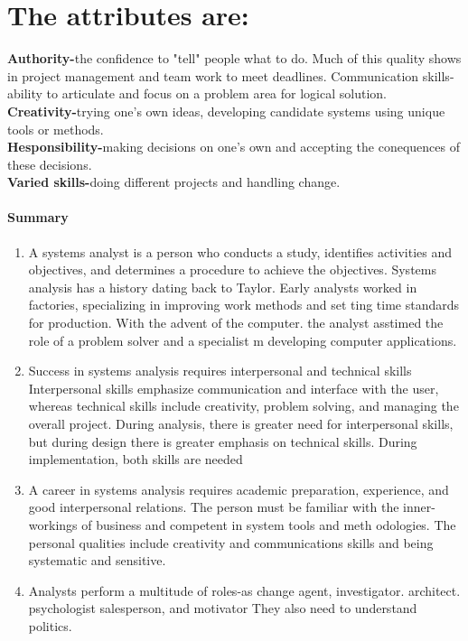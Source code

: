 \documentclass[a4paper,12pt]{report}
\begin{document}
\section{The attributes are:}
\textbf{Authority-}the confidence to "tell" people what to do. Much of this quality shows in project management and team work to meet deadlines. Communication skills-ability to articulate and focus on a problem area for logical solution.\\
\textbf{Creativity-}trying one's own ideas, developing candidate systems using unique tools or methods.\\
\textbf{Hesponsibility-}making decisions on one's own and accepting the conequences of these decisions.\\
\textbf{Varied skills-}doing different projects and handling change.
\paragraph{Summary }
\begin{enumerate}
	\item A systems analyst is a person who conducts a study, identifies activities and objectives, and determines a procedure to achieve the objectives. Systems analysis has a history dating back to Taylor. Early analysts worked in factories, specializing in improving work methods and set ting time standards for production. With the advent of the computer. the analyst asstimed the role of a problem solver and a specialist m developing computer applications.
	\item Success in systems analysis requires interpersonal and technical skills Interpersonal skills emphasize communication and interface with the user, whereas technical skills include creativity, problem solving, and managing the overall project. During analysis, there is greater need for interpersonal skills, but during design there is greater emphasis on technical skills. During implementation, both skills are needed
	\item A career in systems analysis requires academic preparation, experience, and good interpersonal relations. The person must be familiar with the inner-workings of business and competent in system tools and meth odologies. The personal qualities include creativity and communications skills and being systematic and sensitive.
	\item Analysts perform a multitude of roles-as change agent, investigator. architect. psychologist salesperson, and motivator They also need to understand politics.
\end{enumerate}
\end{document}
